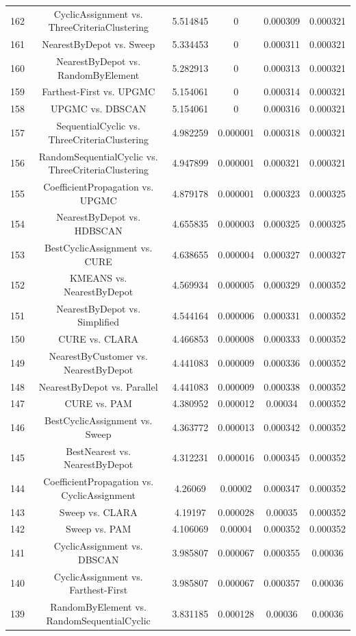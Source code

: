 \documentclass[a4paper,10pt]{article}
\begin{document}
\begin{landscape}
\begin{table}[!htp]
\begin{tabular}{cccccc}
162&CyclicAssignment vs. ThreeCriteriaClustering&5.514845&0&0.000309&0.000321\\
161&NearestByDepot vs. Sweep&5.334453&0&0.000311&0.000321\\
160&NearestByDepot vs. RandomByElement&5.282913&0&0.000313&0.000321\\
159&Farthest-First vs. UPGMC&5.154061&0&0.000314&0.000321\\
158&UPGMC vs. DBSCAN&5.154061&0&0.000316&0.000321\\
157&SequentialCyclic vs. ThreeCriteriaClustering&4.982259&0.000001&0.000318&0.000321\\
156&RandomSequentialCyclic vs. ThreeCriteriaClustering&4.947899&0.000001&0.000321&0.000321\\
155&CoefficientPropagation vs. UPGMC&4.879178&0.000001&0.000323&0.000325\\
154&NearestByDepot vs. HDBSCAN&4.655835&0.000003&0.000325&0.000325\\
153&BestCyclicAssignment vs. CURE&4.638655&0.000004&0.000327&0.000327\\
152&KMEANS vs. NearestByDepot&4.569934&0.000005&0.000329&0.000352\\
151&NearestByDepot vs. Simplified&4.544164&0.000006&0.000331&0.000352\\
150&CURE vs. CLARA&4.466853&0.000008&0.000333&0.000352\\
149&NearestByCustomer vs. NearestByDepot&4.441083&0.000009&0.000336&0.000352\\
148&NearestByDepot vs. Parallel&4.441083&0.000009&0.000338&0.000352\\
147&CURE vs. PAM&4.380952&0.000012&0.00034&0.000352\\
146&BestCyclicAssignment vs. Sweep&4.363772&0.000013&0.000342&0.000352\\
145&BestNearest vs. NearestByDepot&4.312231&0.000016&0.000345&0.000352\\
144&CoefficientPropagation vs. CyclicAssignment&4.26069&0.00002&0.000347&0.000352\\
143&Sweep vs. CLARA&4.19197&0.000028&0.00035&0.000352\\
142&Sweep vs. PAM&4.106069&0.00004&0.000352&0.000352\\
141&CyclicAssignment vs. DBSCAN&3.985807&0.000067&0.000355&0.00036\\
140&CyclicAssignment vs. Farthest-First&3.985807&0.000067&0.000357&0.00036\\
139&RandomByElement vs. RandomSequentialCyclic&3.831185&0.000128&0.00036&0.00036\\

\end{tabular}
\end{table}
\end{landscape}
\end{document}
